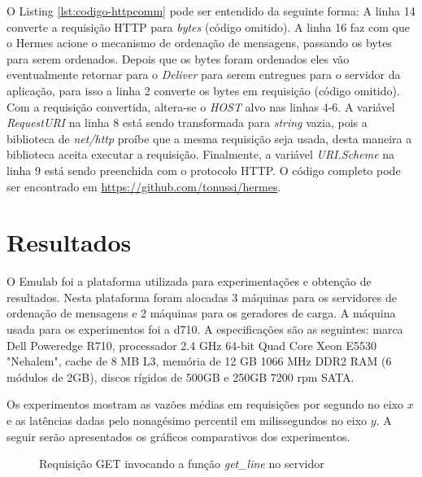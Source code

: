 \documentclass[12pt]{article}
\begin{document}


O Listing \ref{lst:codigo-httpcomm} pode ser entendido da seguinte forma: A linha 14 converte a requisição {HTTP} para \textit{bytes} (código omitido). A linha 16 faz com que o Hermes acione o mecanismo de ordenação de mensagens, passando os bytes para serem ordenados. Depois que os bytes foram ordenados eles vão eventualmente retornar para o \textit{Deliver} para serem entregues para o servidor da aplicação, para isso a linha 2 converte os bytes em requisição (código omitido). Com a requisição convertida, altera-se o \textit{HOST} alvo nas linhas 4-6. A variável \textit{RequestURI} na linha 8 está sendo transformada para \textit{string} vazia, pois a biblioteca de \textit{net/http} proíbe que a mesma requisição seja usada, desta maneira a biblioteca aceita executar a requisição. Finalmente, a variável \textit{URI.Scheme} na linha 9 está sendo preenchida com o protocolo {HTTP}. O código completo pode ser encontrado em \url{https://github.com/tonussi/hermes}.

\section{Resultados} \label{sec:res}

O Emulab foi a plataforma utilizada para experimentações e obtenção de resultados. Nesta plataforma foram alocadas 3 máquinas para os servidores de ordenação de mensagens e 2 máquinas para os geradores de carga. A máquina usada para os experimentos foi a d710. A especificações são as seguintes: marca Dell Poweredge R710, processador 2.4 GHz 64-bit Quad Core Xeon E5530 "Nehalem", cache de 8 MB L3, memória de 12 GB 1066 MHz DDR2 RAM (6 módulos de 2GB), discos rígidos de 500GB e 250GB 7200 rpm SATA.


Os experimentos mostram as vazões médias em requisições por segundo no eixo $x$ e as latências dadas pelo nonagésimo percentil em milissegundos no eixo $y$. A seguir serão apresentados os gráficos comparativos dos experimentos.

\begin{figure}[htb!]
\centering
\caption{Requisição GET invocando a função \textit{get\_line} no servidor}

\label{fig:get-line}
\end{figure}
\end{document}
